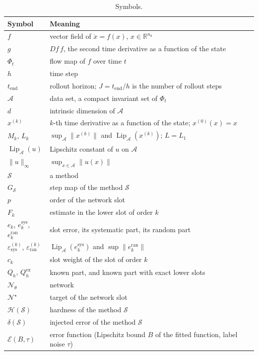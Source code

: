 \documentclass[11pt]{article}
\theoremstyle{definition}
\theoremstyle{remark}
\newcommand{\R}{\mathbb{R}}
\newcommand{\Aset}{\mathcal{A}}          %
\newcommand{\Net}{\mathcal{N}_\theta}    %
\newcommand{\Netstar}{\mathcal{N}^\star} %
\newcommand{\Meth}{\mathcal{S}}          %
\newcommand{\Hard}{\mathcal{H}}          %
\newcommand{\Err}{\mathcal{E}}           %
\newcommand{\Lip}{\operatorname{Lip}_{\Aset}}
\newcommand{\supA}[1]{\|#1\|_{\infty}}
\newcommand{\sys}{\mathrm{sys}}
\newcommand{\ran}{\mathrm{ran}}
\newcommand{\ex}{\mathrm{ex}}
\begin{document}
\begin{table}[htbp]
\centering
\caption{Symbols.}\label{tab:symbols}
\small
\begin{tabular}{@{}p{}p{}@{}}
\toprule
Symbol & Meaning \\
\midrule
$f$ & vector field of $\dot x = f(x)$, $x \in \R^{n_{\mathrm{x}}}$ \\
$g$ & $Df\, f$, the second time derivative as a function of the state \\
$\Phi_t$ & flow map of $f$ over time $t$ \\
$h$ & time step \\
$t_{\mathrm{end}}$ & rollout horizon; $J = t_{\mathrm{end}}/h$ is the number of rollout steps \\
$\Aset$ & data set, a compact invariant set of $\Phi_t$ \\
$d$ & intrinsic dimension of $\Aset$ \\
$x^{(k)}$ & $k$-th time derivative as a function of the state; $x^{(0)}(x) = x$ \\
$M_k$, $L_k$ & $\sup_{\Aset}\|x^{(k)}\|$ and $\Lip(x^{(k)})$; $L = L_1$ \\
$\Lip(u)$ & Lipschitz constant of $u$ on $\Aset$ \\
$\supA{u}$ & $\sup_{x\in\Aset}\|u(x)\|$ \\
$\Meth$ & a method \\
$G_\Meth$ & step map of the method $\Meth$ \\
$p$ & order of the network slot \\
$F_k$ & estimate in the lower slot of order $k$ \\
$e_k$, $e_k^\sys$, $e_k^\ran$ & slot error, its systematic part, its random part \\
$\varepsilon^{(k)}_\sys$, $\varepsilon^{(k)}_\ran$ & $\Lip(e^\sys_k)$ and $\sup\|e^\ran_k\|$ \\
$c_k$ & slot weight of the slot of order $k$ \\
$Q_h$, $Q_h^\ex$ & known part, and known part with exact lower slots \\
$\Net$ & network \\
$\Netstar$ & target of the network slot \\
$\Hard(\Meth)$ & hardness of the method $\Meth$ \\
$\delta(\Meth)$ & injected error of the method $\Meth$ \\
$\Err(B,\tau)$ & error function (Lipschitz bound $B$ of the fitted function, label noise $\tau$) \\

\end{tabular}
\end{table}
\end{document}
